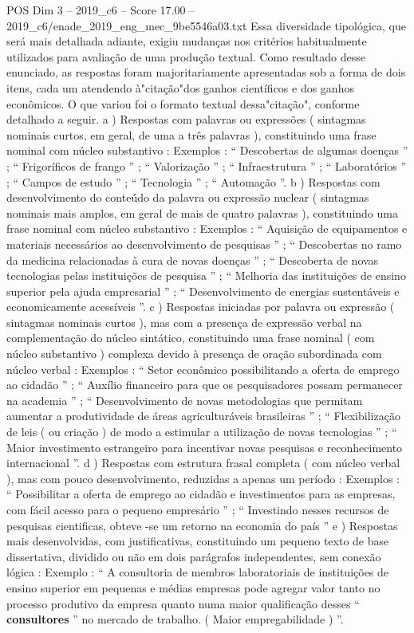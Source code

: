 \begin{textsample}{POS Dim 3 – 2019\_c6 – Score 17.00 – 2019\_c6/enade\_2019\_eng\_mec\_9be5546a03.txt}
Essa diversidade tipológica, que será mais detalhada adiante, exigiu mudanças nos critérios habitualmente utilizados para avaliação de uma produção textual.
Como resultado desse enunciado, as respostas foram majoritariamente apresentadas sob a forma de dois itens, cada um atendendo à"citação"dos ganhos científicos e dos ganhos econômicos.
O que variou foi o formato textual dessa"citação", conforme detalhado a seguir. a ) Respostas com palavras ou expressões ( sintagmas nominais curtos, em geral, de uma a três palavras ), constituindo uma frase nominal com núcleo substantivo : Exemplos : “ Descobertas de algumas doenças ” ; “ Frigoríficos de frango ” ; “ Valorização ” ; “ Infraestrutura ” ; “ Laboratórios ” ; “ Campos de estudo ” ; “ Tecnologia ” ; “ Automação ”. b ) Respostas com desenvolvimento do conteúdo da palavra ou expressão nuclear ( sintagmas nominais mais amplos, em geral de mais de quatro palavras ), constituindo uma frase nominal com núcleo substantivo : Exemplos : “ Aquisição de equipamentos e materiais necessários ao desenvolvimento de pesquisas ” ; “ Descobertas no ramo da medicina relacionadas à cura de novas doenças ” ; “ Descoberta de novas tecnologias pelas instituições de pesquisa ” ; “ Melhoria das instituições de ensino superior pela ajuda empresarial ” ; “ Desenvolvimento de energias sustentáveis e economicamente acessíveis ”. c ) Respostas iniciadas por palavra ou expressão ( sintagmas nominais curtos ), mas com a presença de expressão verbal na complementação do núcleo sintático, constituindo uma frase nominal ( com núcleo substantivo ) complexa devido à presença de oração subordinada com núcleo verbal : Exemplos : “ Setor econômico possibilitando a oferta de emprego ao cidadão ” ; “ Auxílio financeiro para que os pesquisadores possam permanecer na academia ” ; “ Desenvolvimento de novas metodologias que permitam aumentar a produtividade de áreas agriculturáveis brasileiras ” ; “ Flexibilização de leis ( ou criação ) de modo a estimular a utilização de novas tecnologias ” ; “ Maior investimento estrangeiro para incentivar novas pesquisas e reconhecimento internacional ”. d ) Respostas com estrutura frasal completa ( com núcleo verbal ), mas com pouco desenvolvimento, reduzidas a apenas um período : Exemplos : “ Possibilitar a oferta de emprego ao cidadão e investimentos para as empresas, com fácil acesso para o pequeno empresário ” ; “ Investindo nesses recursos de pesquisas cientificas, obteve -se um retorno na economia do país ” e ) Respostas mais desenvolvidas, com justificativas, constituindo um pequeno texto de base dissertativa, dividido ou não em dois parágrafos independentes, sem conexão lógica : Exemplo : “ A consultoria de membros laboratoriais de instituições de ensino superior em pequenas e médias empresas pode agregar valor tanto no processo produtivo da empresa quanto numa maior qualificação desses “ \textbf{consultores} ” no mercado de trabalho. ( Maior empregabilidade ) ”.

\end{textsample}
